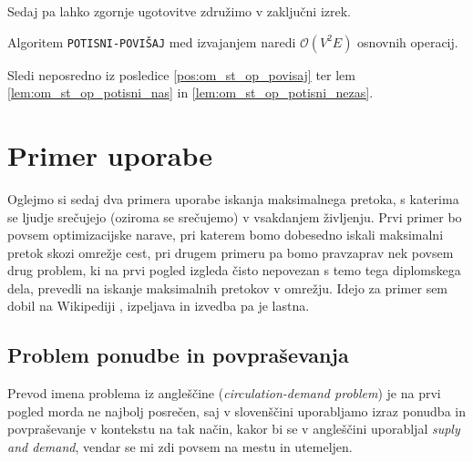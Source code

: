 \documentclass[mat1]{fmfdelo}
\begin{document}
Sedaj pa lahko zgornje ugotovitve združimo v zaključni izrek.

\begin{izrek}
Algoritem \texttt{POTISNI-POVIŠAJ} med izvajanjem na\-redi $\mathcal{O}(V^2E)$ osnovnih operacij.
\end{izrek}

\begin{dokaz}
Sledi neposredno iz posledice \ref{pos:om_st_op_povisaj} ter lem \ref{lem:om_st_op_potisni_nas} in \ref{lem:om_st_op_potisni_nezas}.
\end{dokaz}


\section{Primer uporabe}


Oglejmo si sedaj dva primera uporabe iskanja maksimalnega pretoka, s katerima se ljudje srečujejo (oziroma se srečujemo) v vsakdanjem življenju. Prvi primer bo povsem
optimizacijske narave, pri katerem bomo dobesedno iskali maksimalni pretok skozi omrežje cest, pri drugem primeru
pa bomo pravzaprav nek povsem drug problem, ki na prvi pogled izgleda čisto nepovezan s temo tega diplomskega
dela, prevedli na iskanje maksimalnih pretokov v omrežju. Idejo za primer sem dobil na Wikipediji \cite{wiki}, izpeljava in izvedba pa je lastna.


\subsection{Problem ponudbe in povpraševanja}

Prevod imena problema iz angleščine (\textit{circulation-demand problem}) je na prvi pogled morda ne najbolj posrečen,
saj v slovenščini uporabljamo izraz ponudba in povpraševanje v kontekstu na tak način, kakor bi se v angleščini uporabljal
\textit{suply and demand}, vendar se mi zdi povsem na mestu in utemeljen.
\end{document}
